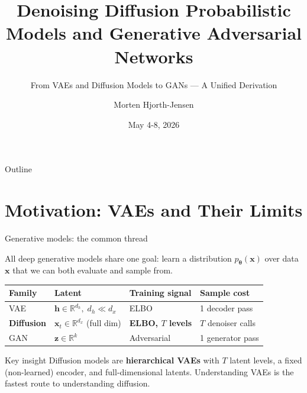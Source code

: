 \documentclass[aspectratio=169,11pt]{beamer}
\title[Diffusion Models and GANs]{Denoising Diffusion Probabilistic Models and Generative Adversarial Networks}
\subtitle{From VAEs and Diffusion Models to GANs --- A Unified Derivation}
\author[M.\ Hjorth-Jensen]{Morten Hjorth-Jensen}
\institute[UiO/MSU]{Department of Physics \& CCSE, University of Oslo}
\date{May 4-8, 2026}
\newcommand{\R}{\mathbb{R}}
\newcommand{\bx}{\bm{x}}
\newcommand{\bh}{\bm{h}}
\newcommand{\bz}{\bm{z}}
\newcommand{\btheta}{\bm{\theta}}
\begin{document}

\begin{frame}[plain]
  \titlepage
\end{frame}

\begin{frame}[allowframebreaks]{Outline}
  \scriptsize
  \tableofcontents[hideallsubsections]
\end{frame}

\section{Motivation: VAEs and Their Limits}

\begin{frame}{Generative models: the common thread}

All deep generative models share one goal: learn a distribution
$p_{\btheta}(\bx)$ over data~$\bx$ that we can both evaluate and sample from.

\medskip
\begin{center}
\renewcommand{\arraystretch}{1.25}
\begin{tabular}{llll}
\toprule
\textbf{Family} & \textbf{Latent} & \textbf{Training signal} & \textbf{Sample cost}\\
\midrule
VAE            & $\bh \in \R^{d_h},\;d_h\!\ll\!d_x$ & ELBO             & 1 decoder pass\\
\textbf{Diffusion} & $\bx_t\in\R^{d_x}$ (full dim)  & \textbf{ELBO, $T$ levels} & $T$ denoiser calls\\
GAN            & $\bz\in\R^k$                       & Adversarial      & 1 generator pass\\
\bottomrule
\end{tabular}
\end{center}

\medskip
\begin{alertblock}{Key insight}
Diffusion models are \textbf{hierarchical VAEs} with $T$ latent levels,
a fixed (non-learned) encoder, and full-dimensional latents.
Understanding VAEs is the fastest route to understanding diffusion.
\end{alertblock}
\end{frame}
\end{document}
